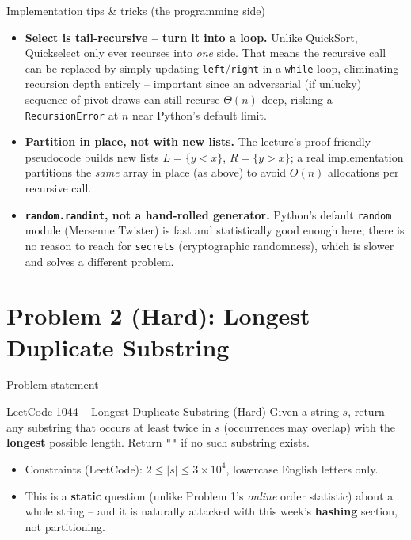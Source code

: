 \documentclass[11pt,aspectratio=169]{beamer}
\begin{document}
\begin{frame}{Implementation tips \& tricks (the programming side)}
  \small
  \begin{itemize}
    \item \textbf{Select is tail-recursive -- turn it into a loop.} Unlike QuickSort,
    Quickselect only ever recurses into \emph{one} side. That means the recursive call
    can be replaced by simply updating \texttt{left}/\texttt{right} in a
    \texttt{while} loop, eliminating recursion depth entirely -- important since an
    adversarial (if unlucky) sequence of pivot draws can still recurse $\Theta(n)$
    deep, risking a \texttt{RecursionError} at $n$ near Python's default limit.
    \item \textbf{Partition in place, not with new lists.} The lecture's proof-friendly
    pseudocode builds new lists $L=\{y<x\}$, $R=\{y>x\}$; a real implementation
    partitions the \emph{same} array in place (as above) to avoid $O(n)$ allocations
    per recursive call.
    \item \textbf{\texttt{random.randint}, not a hand-rolled generator.} Python's
    default \texttt{random} module (Mersenne Twister) is fast and statistically good
    enough here; there is no reason to reach for \texttt{secrets} (cryptographic
    randomness), which is slower and solves a different problem.
  \end{itemize}
\end{frame}

\section{Problem 2 (Hard): Longest Duplicate Substring}

\begin{frame}{Problem statement}
  \begin{block}{LeetCode 1044 -- Longest Duplicate Substring
  (\textcolor{red!60!black}{Hard})}
    Given a string $s$, return any substring that occurs at least twice in $s$
    (occurrences may overlap) with the \textbf{longest} possible length. Return
    \texttt{""} if no such substring exists.
  \end{block}
  \begin{itemize}
    \item Constraints (LeetCode): $2 \le |s| \le 3\times10^4$, lowercase English
    letters only.
    \item This is a \textbf{static} question (unlike Problem 1's \emph{online} order
    statistic) about a whole string -- and it is naturally attacked with this week's
    \textbf{hashing} section, not partitioning.
  \end{itemize}
\end{frame}
\end{document}
